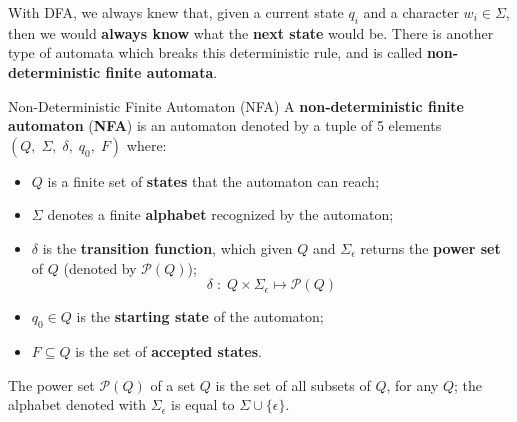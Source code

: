 With DFA, we always knew that, given a current state $q_i$ and a character $w_i \in \Sigma$, then we would \textbf{always know} what the \textbf{next state} would be. There is another type of automata which breaks this deterministic rule, and is called \textbf{non-deterministic finite automata}.

\begin{definition}{Non-Deterministic Finite Automaton (NFA)}
    A \textbf{non-deterministic finite automaton} (\textbf{NFA}) is an automaton denoted by a tuple of 5 elements $(Q, \; \Sigma, \; \delta, \; q_{0}, \; F)$ where:
    \begin{itemize}
        \item $Q$ is a finite set of \textbf{states} that the automaton can reach;
        \item $\Sigma$ denotes a finite \textbf{alphabet} recognized by the automaton;
        \item $\delta$ is the \textbf{transition function}, which given $Q$ and $\Sigma_\epsilon$ returns the \textbf{power set} of $Q$ (denoted by $\mathcal{P}(Q)$);
        \[ \delta \; : \; Q \times \Sigma_\epsilon \longmapsto \mathcal{P}(Q) \]

        \item $q_{0} \in Q$ is the \textbf{starting state} of the automaton;
        \item $F \subseteq Q$ is the set of \textbf{accepted states}.
    \end{itemize}

    \noindent The power set $\mathcal{P}(Q)$ of a set $Q$ is the set of all subsets of $Q$, for any $Q$; the alphabet denoted with $\Sigma_\epsilon$ is equal to $\Sigma \cup \{ \epsilon \}$.
\end{definition}

